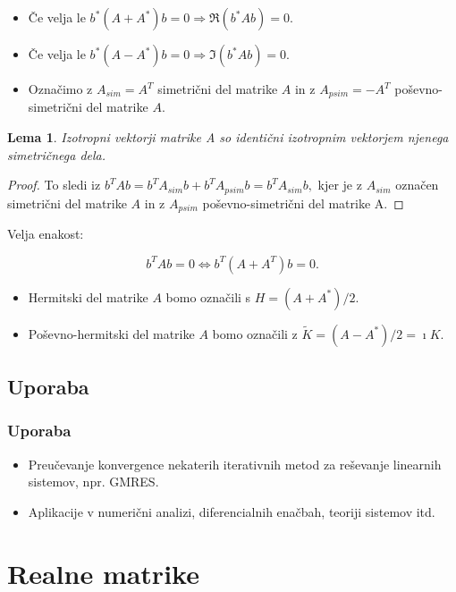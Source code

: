 \documentclass{beamer}
\newtheorem{lema}[izrek]{Lema}
\begin{document}
\begin{frame}
\begin{itemize}
\item Če velja le $b^\ast (A+A^\ast)b=0 \Rightarrow \Re(b^\ast Ab)=0$.
\item Če velja le $b^\ast(A-A^\ast)b=0 \Rightarrow \Im(b^\ast Ab)=0$.
\item Označimo z $A_{sim}=A^T$ simetrični del matrike $A$ in z $A_{psim}=-A^T$ poševno-simetrični del matrike $A$.
\end{itemize}\pause
\begin{lema} %
Izotropni vektorji matrike A so identični izotropnim vektorjem njenega simetričnega dela.
\end{lema} \pause
\begin{proof}
To sledi iz $b^T Ab=b^T A_{sim} b +b^T A_{psim} b=b^T A_{sim} b,$ kjer je z $A_{sim}$ označen simetrični del matrike $A$  in z $A_{psim}$ poševno-simetrični del matrike A.
\end{proof}
\end{frame}
\begin{frame}
Velja enakost:
\begin{block}{}
$$b^T Ab=0 \Leftrightarrow b^T (A+A^T)b=0.$$ 
\end{block}\pause
\begin{itemize}
\item Hermitski del matrike $A$ bomo označili s $H=(A+A^\ast)/2$.
\item Poševno-hermitski del matrike $A$ bomo označili z $\tilde{K}=(A-A^\ast)/2=\imath K$.
\end{itemize}
\end{frame}
\subsection{Uporaba}
\begin{frame}
\frametitle{Uporaba}
\begin{itemize}
\item Preučevanje konvergence nekaterih iterativnih metod za reševanje linearnih sistemov, npr. GMRES.
\item Aplikacije v numerični analizi, diferencialnih enačbah, teoriji sistemov itd.
\end{itemize}
\end{frame}
\section{Realne matrike} %
\end{document}
